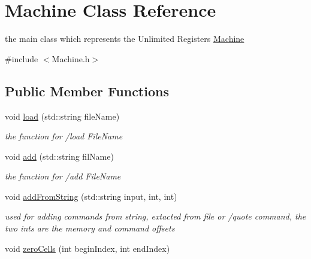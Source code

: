 \hypertarget{class_machine}{}\section{Machine Class Reference}
\label{class_machine}


the main class which represents the Unlimited Registers \mbox{\hyperlink{class_machine}{Machine}}  




{\ttfamily \#include $<$Machine.\+h$>$}

\subsection*{Public Member Functions}
\begin{DoxyCompactItemize}
\item 
\mbox{\label{class_machine_adb7a184832156b30040c73da8de7a669}} 
void \mbox{\hyperlink{class_machine_adb7a184832156b30040c73da8de7a669}{load}} (std\+::string file\+Name)
\begin{DoxyCompactList}\small\item\em the function for /load File\+Name \end{DoxyCompactList}\item 
\mbox{\label{class_machine_a4850368483ad53fd3c8c63265be5364f}} 
void \mbox{\hyperlink{class_machine_a4850368483ad53fd3c8c63265be5364f}{add}} (std\+::string fil\+Name)
\begin{DoxyCompactList}\small\item\em the function for /add File\+Name \end{DoxyCompactList}\item 
\mbox{\label{class_machine_a4762963ce19d476fe6285de31da3edc2}} 
void \mbox{\hyperlink{class_machine_a4762963ce19d476fe6285de31da3edc2}{add\+From\+String}} (std\+::string input, int, int)
\begin{DoxyCompactList}\small\item\em used for adding commands from string, extacted from file or /quote command, the two ints are the memory and command offsets \end{DoxyCompactList}\item 
\mbox{\label{class_machine_af173bba6525394e5799d337c9172d27f}} 
void \mbox{\hyperlink{class_machine_af173bba6525394e5799d337c9172d27f}{zero\+Cells}} (int begin\+Index, int end\+Index)

\end{DoxyCompactItemize}
